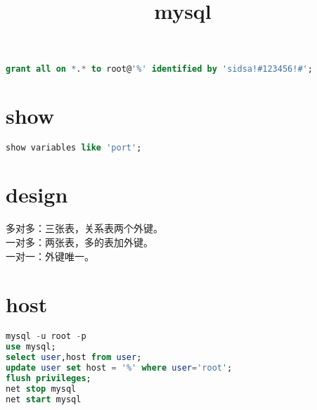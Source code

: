 \documentclass[12pt,twiside,a4paper]{book}
\numberwithin{chapter}{part}
\begin{document}
\author
{
}

\title{mysql}
\maketitle
\tableofcontents %
\newpage
\pagestyle{fancy}

\section{}
\begin{lstlisting}[language=sql,breaklines = true]
grant all on *.* to root@'%' identified by 'sidsa!#123456!#';
\end{lstlisting}

\section{show}
\begin{lstlisting}[language=sql,breaklines = true]
show variables like 'port';
\end{lstlisting}
\section{design}
多对多：三张表，关系表两个外键。\\
一对多：两张表，多的表加外键。\\
一对一：外键唯一。

\section{host}
\begin{lstlisting}[language=sql,breaklines = true]
mysql -u root -p
use mysql;
select user,host from user;
update user set host = '%' where user='root';
flush privileges;
net stop mysql
net start mysql
\end{lstlisting}
\end{document}
